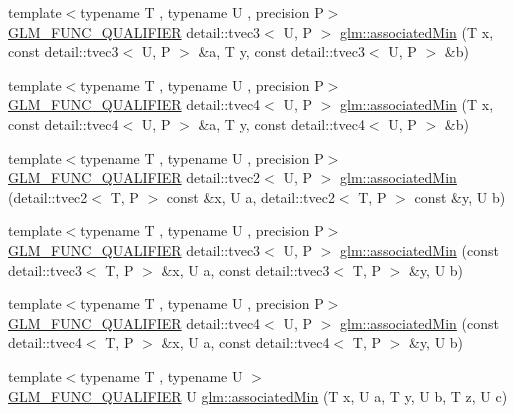 \begin{DoxyCompactItemize}
\item 
{\footnotesize template$<$typename T , typename U , precision P$>$ }\\\hyperlink{setup_8hpp_a33fdea6f91c5f834105f7415e2a64407}{G\+L\+M\+\_\+\+F\+U\+N\+C\+\_\+\+Q\+U\+A\+L\+I\+F\+I\+ER} detail\+::tvec3$<$ U, P $>$ \hyperlink{namespaceglm_a546b865980a6592d3b0223d74ee70907}{glm\+::associated\+Min} (T x, const detail\+::tvec3$<$ U, P $>$ \&a, T y, const detail\+::tvec3$<$ U, P $>$ \&b)
\item 
{\footnotesize template$<$typename T , typename U , precision P$>$ }\\\hyperlink{setup_8hpp_a33fdea6f91c5f834105f7415e2a64407}{G\+L\+M\+\_\+\+F\+U\+N\+C\+\_\+\+Q\+U\+A\+L\+I\+F\+I\+ER} detail\+::tvec4$<$ U, P $>$ \hyperlink{namespaceglm_a1276323c70c6a08d73089c1f3734d3a1}{glm\+::associated\+Min} (T x, const detail\+::tvec4$<$ U, P $>$ \&a, T y, const detail\+::tvec4$<$ U, P $>$ \&b)
\item 
{\footnotesize template$<$typename T , typename U , precision P$>$ }\\\hyperlink{setup_8hpp_a33fdea6f91c5f834105f7415e2a64407}{G\+L\+M\+\_\+\+F\+U\+N\+C\+\_\+\+Q\+U\+A\+L\+I\+F\+I\+ER} detail\+::tvec2$<$ U, P $>$ \hyperlink{namespaceglm_a4e89b83acf8c80dc111e5152e8e52a75}{glm\+::associated\+Min} (detail\+::tvec2$<$ T, P $>$ const \&x, U a, detail\+::tvec2$<$ T, P $>$ const \&y, U b)
\item 
{\footnotesize template$<$typename T , typename U , precision P$>$ }\\\hyperlink{setup_8hpp_a33fdea6f91c5f834105f7415e2a64407}{G\+L\+M\+\_\+\+F\+U\+N\+C\+\_\+\+Q\+U\+A\+L\+I\+F\+I\+ER} detail\+::tvec3$<$ U, P $>$ \hyperlink{namespaceglm_ab8754d89ded0882c28671f13a66a11de}{glm\+::associated\+Min} (const detail\+::tvec3$<$ T, P $>$ \&x, U a, const detail\+::tvec3$<$ T, P $>$ \&y, U b)
\item 
{\footnotesize template$<$typename T , typename U , precision P$>$ }\\\hyperlink{setup_8hpp_a33fdea6f91c5f834105f7415e2a64407}{G\+L\+M\+\_\+\+F\+U\+N\+C\+\_\+\+Q\+U\+A\+L\+I\+F\+I\+ER} detail\+::tvec4$<$ U, P $>$ \hyperlink{namespaceglm_a5b01b43448d92d25fd2a93ab8bade0ee}{glm\+::associated\+Min} (const detail\+::tvec4$<$ T, P $>$ \&x, U a, const detail\+::tvec4$<$ T, P $>$ \&y, U b)
\item 
{\footnotesize template$<$typename T , typename U $>$ }\\\hyperlink{setup_8hpp_a33fdea6f91c5f834105f7415e2a64407}{G\+L\+M\+\_\+\+F\+U\+N\+C\+\_\+\+Q\+U\+A\+L\+I\+F\+I\+ER} U \hyperlink{namespaceglm_a7a59f677a5e4fc9274bc9ae72cd51c75}{glm\+::associated\+Min} (T x, U a, T y, U b, T z, U c)

\end{DoxyCompactItemize}
